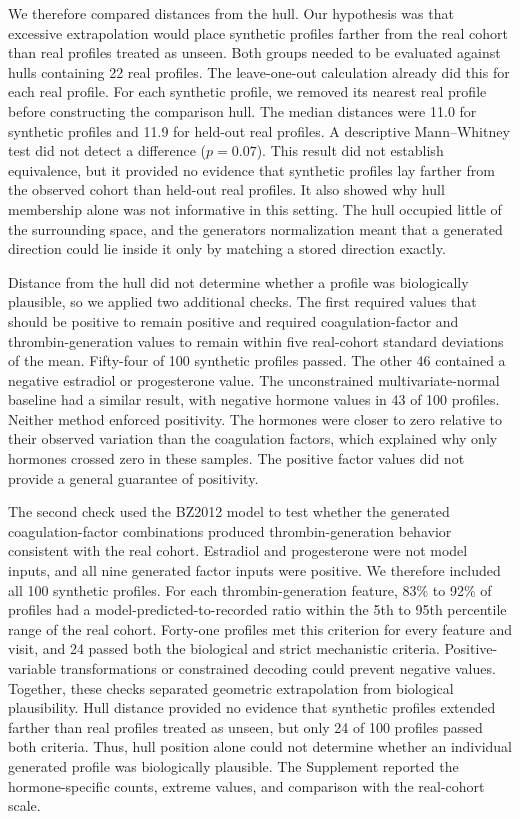 \documentclass[
  11pt,
  letterpaper,
]{article}
\begin{document}
We therefore compared distances from the hull. Our hypothesis was that excessive extrapolation would place synthetic profiles farther from the real cohort than real profiles treated as unseen. Both groups needed to be evaluated against hulls containing 22 real profiles. The leave-one-out calculation already did this for each real profile. For each synthetic profile, we removed its nearest real profile before constructing the comparison hull. The median distances were 11.0 for synthetic profiles and 11.9 for held-out real profiles. A descriptive Mann--Whitney test did not detect a difference (\(p=0.07\)). This result did not establish equivalence, but it provided no evidence that synthetic profiles lay farther from the observed cohort than held-out real profiles. It also showed why hull membership alone was not informative in this setting. The hull occupied little of the surrounding space, and the generator\textquotesingle s normalization meant that a generated direction could lie inside it only by matching a stored direction exactly.

Distance from the hull did not determine whether a profile was biologically plausible, so we applied two additional checks. The first required values that should be positive to remain positive and required coagulation-factor and thrombin-generation values to remain within five real-cohort standard deviations of the mean. Fifty-four of 100 synthetic profiles passed. The other 46 contained a negative estradiol or progesterone value. The unconstrained multivariate-normal baseline had a similar result, with negative hormone values in 43 of 100 profiles. Neither method enforced positivity. The hormones were closer to zero relative to their observed variation than the coagulation factors, which explained why only hormones crossed zero in these samples. The positive factor values did not provide a general guarantee of positivity.

The second check used the BZ2012 model to test whether the generated coagulation-factor combinations produced thrombin-generation behavior consistent with the real cohort. Estradiol and progesterone were not model inputs, and all nine generated factor inputs were positive. We therefore included all 100 synthetic profiles. For each thrombin-generation feature, 83\% to 92\% of profiles had a model-predicted-to-recorded ratio within the 5th to 95th percentile range of the real cohort. Forty-one profiles met this criterion for every feature and visit, and 24 passed both the biological and strict mechanistic criteria. Positive-variable transformations or constrained decoding could prevent negative values. Together, these checks separated geometric extrapolation from biological plausibility. Hull distance provided no evidence that synthetic profiles extended farther than real profiles treated as unseen, but only 24 of 100 profiles passed both criteria. Thus, hull position alone could not determine whether an individual generated profile was biologically plausible. The Supplement reported the hormone-specific counts, extreme values, and comparison with the real-cohort scale.
\end{document}
